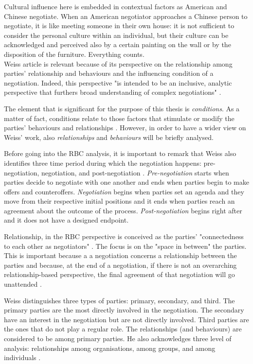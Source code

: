 \documentclass[../main.tex]{subfiles}
\begin{document}
Cultural influence here is embedded in contextual factors as American and Chinese negotiate. When an American negotiator approaches a Chinese person to negotiate, it is like meeting someone in their own house: it is not sufficient to consider the personal culture within an individual, but their culture can be acknowledged and perceived also by a certain painting on the wall or by the disposition of the furniture. Everything counts.\\

Weiss article is relevant because of its perspective on the relationship among parties' relationship and behaviours and the influencing condition of a negotiation. Indeed, this perspective "is intended to be an inclusive, analytic perspective that furthers broad understanding of complex negotiations" \autocite[275]{weiss}.

The element that is significant for the purpose of this thesis is \textit{conditions}. As a matter of fact, conditions relate to those factors that stimulate or modify the parties' behaviours and relationships \autocite[286]{weiss}. However, in order to have a wider view on Weiss' work, also \textit{relationships} and \textit{behaviours} will be briefly analysed.

Before going into the RBC analysis, it is important to remark that Weiss also identifies three time period during which the negotiation happens: pre-negotiation, negotiation, and post-negotiation \autocite[289]{weiss}.
\textit{Pre-negotiation} starts when parties decide to negotiate with one another and ends when parties begin to make offers and counteroffers.
\textit{Negotiation} begins when parties set an agenda and they move from their respective initial positions and it ends when parties reach an agreement about the outcome of the process. \textit{Post-negotiation} begins right after and it does not have a designed endpoint.

Relationship, in the RBC perspective is conceived as the parties' "connectedness to each other as negotiators" \autocite[277]{weiss}. The focus is on the "space in between" the parties. This is important because a a negotiation concerns a relationship between the parties and because, at the end of a negotiation, if there is not an overarching relationship-based perspective, the final agreement of that negotiation will go unattended \mancite\autocite[277]{weiss}.

Weiss distinguishes three types of parties: primary, secondary, and third. The primary parties are the most directly involved in the negotiation. The secondary have an interest in the negotiation but are not directly involved. Third parties are the ones that do not play a regular role. The relationships (and behaviours) are considered to be among primary parties.
He also acknowledges three level of analysis: relationships among organisations, among groups, and among individuals \mancite\autocite[278]{weiss}.
\end{document}

